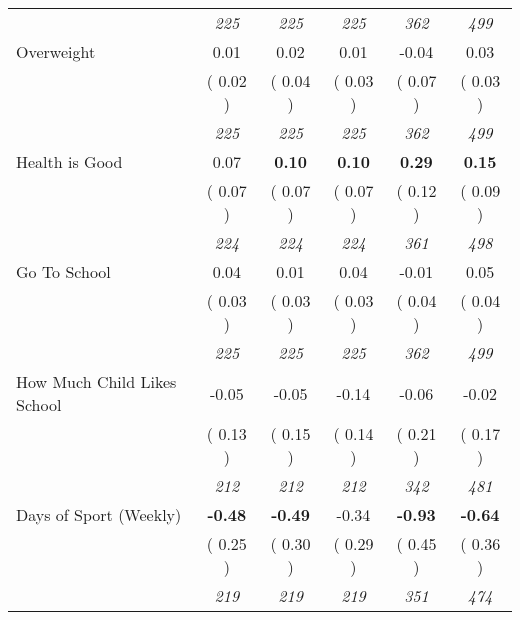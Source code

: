 \begin{tabular}{l c c c c c}
& \textit{ 225 } & \textit{ 225 } & \textit{ 225 } & \textit{ 362 } & \textit{ 499 } \\
Overweight &      0.01 &      0.02 &      0.01 &     -0.04 &      0.03 \\
& (     0.02 ) & (     0.04 ) & (     0.03 ) & (     0.07 ) & (     0.03 ) \\
& \textit{ 225 } & \textit{ 225 } & \textit{ 225 } & \textit{ 362 } & \textit{ 499 } \\
Health is Good &      0.07 & \textbf{      0.10 } & \textbf{      0.10 } & \textbf{      0.29 } & \textbf{      0.15 } \\
& (     0.07 ) & (     0.07 ) & (     0.07 ) & (     0.12 ) & (     0.09 ) \\
& \textit{ 224 } & \textit{ 224 } & \textit{ 224 } & \textit{ 361 } & \textit{ 498 } \\
Go To School &      0.04 &      0.01 &      0.04 &     -0.01 &      0.05 \\
& (     0.03 ) & (     0.03 ) & (     0.03 ) & (     0.04 ) & (     0.04 ) \\
& \textit{ 225 } & \textit{ 225 } & \textit{ 225 } & \textit{ 362 } & \textit{ 499 } \\
How Much Child Likes School &     -0.05 &     -0.05 &     -0.14 &     -0.06 &     -0.02 \\
& (     0.13 ) & (     0.15 ) & (     0.14 ) & (     0.21 ) & (     0.17 ) \\
& \textit{ 212 } & \textit{ 212 } & \textit{ 212 } & \textit{ 342 } & \textit{ 481 } \\
Days of Sport (Weekly) & \textbf{     -0.48 } & \textbf{     -0.49 } &     -0.34 & \textbf{     -0.93 } & \textbf{     -0.64 } \\
& (     0.25 ) & (     0.30 ) & (     0.29 ) & (     0.45 ) & (     0.36 ) \\
& \textit{ 219 } & \textit{ 219 } & \textit{ 219 } & \textit{ 351 } & \textit{ 474 } \\
\bottomrule
\end{tabular}
